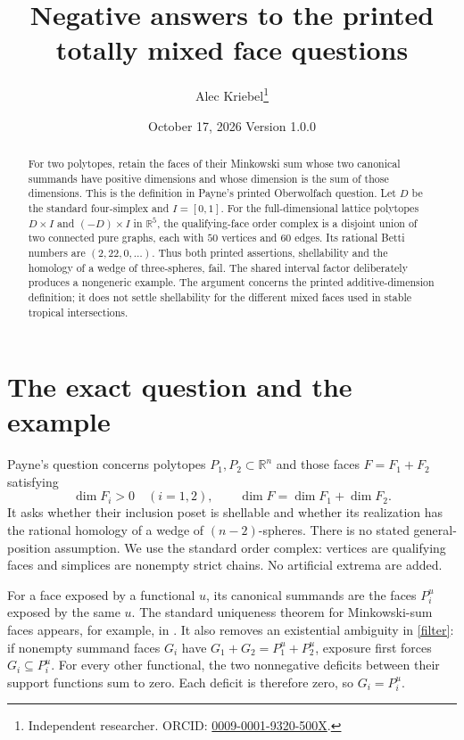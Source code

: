 \documentclass[11pt]{article}
\title{Negative answers to the printed\\totally mixed face questions}
\author{Alec Kriebel\thanks{Independent researcher. ORCID:
\href{https://orcid.org/0009-0001-9320-500X}{0009-0001-9320-500X}.}}
\date{October 17, 2026 \quad Version 1.0.0}
\newcommand{\R}{\mathbb R}
\newcommand{\dimn}{\operatorname{dim}}
\begin{document}
\maketitle
\begin{abstract}
For two polytopes, retain the faces of their Minkowski sum whose two
canonical summands have positive dimensions and whose dimension is the
sum of those dimensions. This is the definition in Payne's printed
Oberwolfach question. Let $D$ be the standard four-simplex and $I=[0,1]$.
For the full-dimensional lattice polytopes $D\times I$ and $(-D)\times I$
in $\R^5$, the qualifying-face order complex is a disjoint union of two
connected pure graphs, each with $50$ vertices and $60$ edges. Its
rational Betti numbers are $(2,22,0,\ldots)$. Thus both printed
assertions, shellability and the homology of a wedge of three-spheres,
fail. The shared interval factor deliberately produces a nongeneric
example. The argument concerns the printed additive-dimension
definition; it does not settle shellability for the different mixed
faces used in stable tropical intersections.
\end{abstract}

\section{The exact question and the example}
Payne's question \cite[p.~2464, Problem~3]{P} concerns polytopes
$P_1,P_2\subset\R^n$ and those faces $F=F_1+F_2$ satisfying
\begin{equation}\label{filter}
 \dimn F_i>0\quad(i=1,2),\qquad
 \dimn F=\dimn F_1+\dimn F_2 .
\end{equation}
It asks whether their inclusion poset is shellable and whether its
realization has the rational homology of a wedge of $(n-2)$-spheres.
There is no stated general-position assumption. We use the standard
order complex: vertices are qualifying faces and simplices are
nonempty strict chains. No artificial extrema are added.

For a face exposed by a functional $u$, its canonical summands are the
faces $P_i^u$ exposed by the same $u$. The standard uniqueness theorem
for Minkowski-sum faces appears, for example, in
\cite[Lemma~4 of the cited arXiv version]{FW}. It also removes an existential ambiguity in
\eqref{filter}: if nonempty summand faces $G_i$ have
$G_1+G_2=P_1^u+P_2^u$, exposure first forces $G_i\subseteq P_i^u$.
For every other functional, the two nonnegative deficits between
their support functions sum to zero. Each deficit is therefore zero,
so $G_i=P_i^u$.
\end{document}
